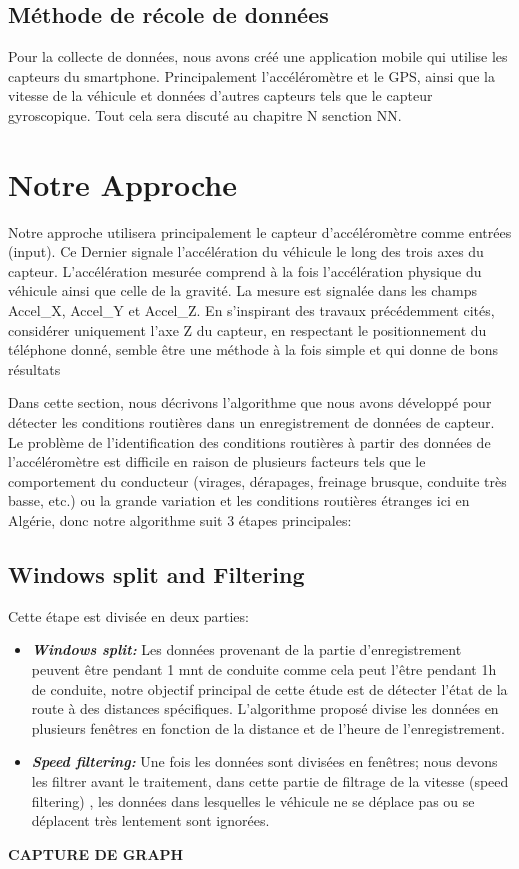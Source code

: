   \subsection{Méthode de récole de données}
  Pour la collecte de données, nous avons créé une application mobile qui utilise les capteurs du smartphone. Principalement l'accéléromètre et le GPS, ainsi que la vitesse de la véhicule et données d'autres capteurs tels que le capteur gyroscopique.\newline
  Tout cela sera discuté au chapitre N senction NN.

\section{Notre Approche}
Notre approche utilisera principalement le capteur d’accéléromètre comme entrées (input).
Ce Dernier signale l'accélération du véhicule le long des trois axes du capteur. \newline
 L'accélération mesurée comprend à la fois l'accélération physique du véhicule ainsi que celle de la gravité. La  mesure est signalée dans les champs Accel\_X, Accel\_Y et Accel\_Z. \newline
 En s’inspirant des travaux précédemment cités, considérer uniquement l’axe Z du capteur, en respectant le positionnement du téléphone donné, semble être une méthode à la fois simple et qui donne de bons résultats 

 Dans cette section, nous décrivons l'algorithme que nous avons développé pour détecter les conditions routières dans un enregistrement de données de capteur. \newline
Le problème de l'identification des conditions routières à partir des données de l'accéléromètre est difficile en raison de plusieurs facteurs tels que le comportement du conducteur (virages, dérapages, freinage brusque, conduite très basse, etc.) ou la grande variation et les conditions routières étranges ici en Algérie, donc notre algorithme suit 3 étapes principales:

\subsection{Windows split and Filtering}
  Cette étape est divisée en deux parties:
  \renewcommand{\labelitemi}{$\bullet$}
    \begin{itemize}
      \item \textbf{\textit{Windows split:}} Les données provenant de la partie d'enregistrement peuvent être pendant 1 mnt de conduite comme cela peut l'être pendant 1h de conduite, notre objectif principal de cette étude est de détecter l'état de la route à des distances spécifiques. L'algorithme proposé divise les données en plusieurs fenêtres en fonction de la distance et de l'heure de l'enregistrement.
      \item \textbf{\textit{Speed filtering:}} Une fois les données sont divisées en fenêtres; nous devons les filtrer avant le traitement, dans cette partie de filtrage de la vitesse (speed filtering) , les données dans lesquelles le véhicule ne se déplace pas ou se déplacent très lentement sont ignorées.
    \end{itemize}
    \textbf{ CAPTURE DE GRAPH}
